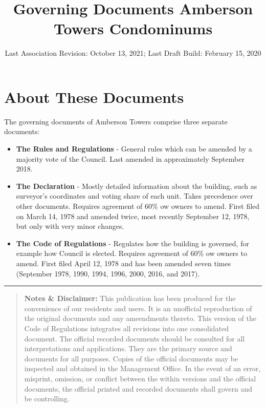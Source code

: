\documentclass[
]{book}
\title{Governing Documents Amberson Towers Condominums}
\author{}
\date{\vspace{-2.5em}Last Association Revision: October 13, 2021; Last Draft Build: February 15, 2020}
\begin{document}
\maketitle

{
\setcounter{tocdepth}{1}
\tableofcontents
}
\hypertarget{about-these-documents}{%
\chapter*{About These Documents}\label{about-these-documents}}

The governing documents of Amberson Towers comprise three separate documents:

\begin{itemize}
\item
  \textbf{The Rules and Regulations} - General rules which can be amended by a majority vote of the Council. Last amended in approximately September 2018.
\item
  \textbf{The Declaration} - Mostly detailed information about the building, such as surveyor's coordinates and voting share of each unit. Takes precedence over other documents. Requires agreement of 60\% ow owners to amend. First filed on March 14, 1978 and amended twice, most recently September 12, 1978, but only with very minor changes.
\item
  \textbf{The Code of Regulations} - Regulates how the building is governed, for example how Council is elected. Requires agreement of 60\% ow owners to amend. First filed April 12, 1978 and has been amended seven times (September 1978, 1990, 1994, 1996, 2000, 2016, and 2017).
\end{itemize}

\begin{center}\rule{0.5\linewidth}{0.5pt}\end{center}

\begin{quote}
\textbf{Notes \& Disclaimer:} This publication has been produced for the convenience of our residents and users. It is an unofficial reproduction of the original documents and any ameendments thereto. This version of the Code of Regulations integrates all revisions into one consolidated document. The official recorded documents should be consulted for all interpretations and applications. They are the primary source and documents for all purposes. Copies of the official documents may be inspected and obtained in the Management Office. In the event of an error, misprint, omission, or conflict between the within versions and the official documents, the official printed and recorded documents shall govern and be controlling.
\end{quote}
\end{document}
